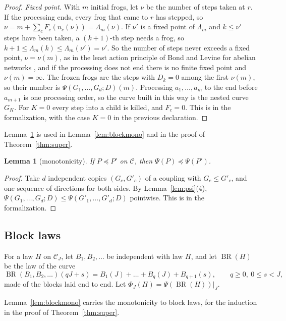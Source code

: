 \documentclass[11pt]{amsart}
\newtheorem{lemma}[theorem]{Lemma}
\theoremstyle{definition}
\numberwithin{equation}{section}
\newcommand{\lean}[1]{\ignorespaces}
\newcommand{\BR}{\operatorname{BR}}
\newcommand{\cC}{\mathcal{C}}
\newcommand{\stle}{\preceq}
\begin{document}
\begin{proof}
\emph{Fixed point.} With $m$ initial frogs, let $\nu$ be the number of steps taken at $r$. If the processing ends, every frog that came to $r$ has stepped, so $\nu=m+\sum_cF_c(n_c(\nu))=\Lambda_m(\nu)$. If $\nu'$ is a fixed point of $\Lambda_m$ and $k\le\nu'$ steps have been taken, a $(k+1)$-th step needs a frog, so $k+1\le\Lambda_m(k)\le\Lambda_m(\nu')=\nu'$. So the number of steps never exceeds a fixed point, $\nu=\nu(m)$, as in the least action principle of Bond and Levine for abelian networks \cite[Lemma~4.3]{BL16}, and if the processing does not end there is no finite fixed point and $\nu(m)=\infty$. The frozen frogs are the steps with $D_k=0$ among the first $\nu(m)$, so their number is $\Psi(G_1,\dots,G_d;D)(m)$. Processing $a_1,\dots,a_m$ to the end before $a_{m+1}$ is one processing order, so the curve built in this way is the nested curve $G_K$. For $K=0$ every step into a child is killed, and $F_c=0$. This is  in the formalization, with the case $K=0$ in the previous declaration.
\end{proof}

Lemma~\ref{lem:mono} is used in Lemma~\ref{lem:blockmono} and in the proof of Theorem~\ref{thm:super}.

\begin{lemma}[monotonicity]\label{lem:mono}\lean{FrogModel.LemmaX.psiLawMono_holds, FrogModel.LemmaX.PsiLawMono, FrogModel.LemmaX.CouplingLE}
If $P\stle P'$ on $\cC$, then $\Psi(P)\stle\Psi(P')$.
\end{lemma}

\begin{proof}
Take $d$ independent copies $(G_c,G'_c)$ of a coupling with $G_c\le G'_c$, and one sequence of directions for both sides. By Lemma~\ref{lem:psi}(4), $\Psi(G_1,\dots,G_d;D)\le\Psi(G'_1,\dots,G'_d;D)$ pointwise. This is  in the formalization.
\end{proof}

\subsection{Block laws}
For a law $H$ on $\cC_J$, let $B_1,B_2,\dots$ be independent with law $H$, and let $\BR(H)$ be the law of the curve
\[
\BR(B_1,B_2,\dots)(qJ+s)=B_1(J)+\dots+B_q(J)+B_{q+1}(s),\qquad q\ge0,\ 0\le s<J,
\]
made of the blocks laid end to end. Let $\Phi_J(H)=\Psi(\BR(H))|_J$.

Lemma~\ref{lem:blockmono} carries the monotonicity to block laws, for the induction in the proof of Theorem~\ref{thm:super}.
\end{document}
